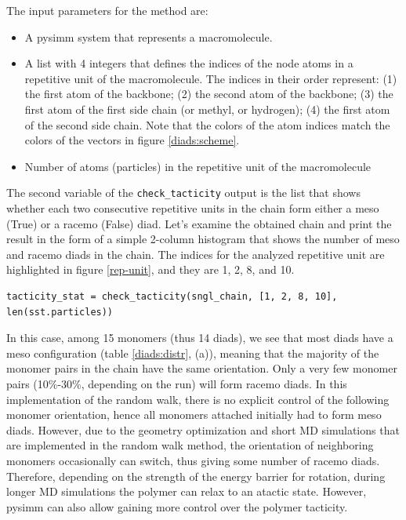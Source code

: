 \documentclass[9pt,tutorial]{livecoms}
\begin{document}
The input parameters for the method are:
\begin{itemize}
 \item A pysimm system that represents a macromolecule.
 \item A list with 4 integers that defines the indices of the node atoms in a repetitive unit of the macromolecule. The indices in their order represent: (1) the first atom of the backbone; (2) the second atom of the backbone; (3) the first atom of the first side chain (or methyl, or hydrogen); (4) the first atom of the second side chain. Note that the colors of the atom indices match the colors of the vectors in figure \ref{diads:scheme}. 
 \item Number of atoms (particles) in the repetitive unit of the macromolecule
\end{itemize}

The second variable of the \lstinline$check_tacticity$ output is the list that shows whether each two consecutive repetitive units in the chain form either a meso (True) or a racemo (False) diad. Let's examine the obtained chain and print the result in the form of a simple 2-column histogram that shows the number of meso and racemo diads in the chain. The indices for the analyzed repetitive unit are highlighted in figure \ref{rep-unit}, and they are 1, 2, 8, and 10.

\begin{lstlisting}
tacticity_stat = check_tacticity(sngl_chain, [1, 2, 8, 10], len(sst.particles))
\end{lstlisting}

In this case, among 15 monomers (thus 14 diads), we see that most diads have a meso configuration (table \ref{diads:distr}, (a)), meaning that the majority of the monomer pairs in the chain have the same orientation. Only a very few monomer pairs (10\%-30\%, depending on the run) will form racemo diads. In this implementation of the random walk, there is no explicit control of the following monomer orientation, hence all monomers attached initially had to form meso diads. However, due to the geometry optimization and short MD simulations that are implemented in the random walk method, the orientation of neighboring monomers occasionally can switch, thus giving some number of racemo diads. Therefore, depending on the strength of the energy barrier for rotation, during longer MD simulations the polymer can relax to an atactic state. However, pysimm can also allow gaining more control over the polymer tacticity.
\end{document}
